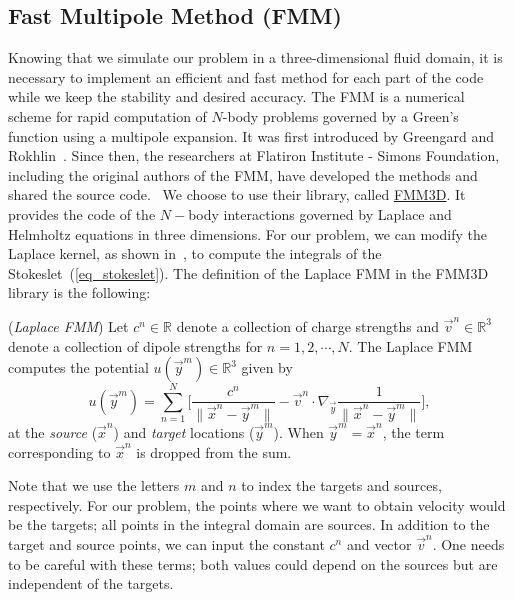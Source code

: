 \subsection{Fast Multipole Method (FMM)}
\label{subsec:FMM}
Knowing that we simulate our problem in a three-dimensional fluid domain, it is necessary to implement an efficient and fast method for each part of the code while we keep the stability and desired accuracy. 
The FMM is a numerical scheme for rapid computation of $N$-body problems governed by a Green's function using a multipole expansion. It was first introduced by Greengard and Rokhlin~\cite{greengard_fast_1987}. Since then, the researchers at Flatiron Institute - Simons Foundation,  including the original authors of the FMM, have developed the methods and shared the source code.~\cite{cheng_fast_1999,greengard_new_1997,greengard_new_2002} We choose to use their library, called \href{https://github.com/flatironinstitute/FMM3D}{{\color{blue}FMM3D}}. It provides the code of the $N-$body interactions governed by Laplace and Helmholtz equations in three dimensions.
For our problem, we can modify the Laplace kernel, as shown in~\cite{tornberg_fast_2008}, to compute the integrals of the Stokeslet~(\ref{eq_stokeslet}).
The definition of the Laplace FMM in the FMM3D library is the following:
\begin{definition} (\textit{Laplace FMM})
	\label{eq_def_FMM}
	Let $c^n \in \mathbb{R}$ denote a collection of charge strengths and $\vec{v}^n \in \mathbb{R}^3$ denote a collection of dipole strengths for $n = 1,2, \cdots, N$.
	The Laplace FMM computes the potential $u(\vec{y}^m) \in \mathbb{R}^3$ given by
\begin{equation}
	u(\vec{y}^m) = \sum_{n = 1}^{N} 
		\Biggl[
		\frac{c^n}{\|\vec{x}^n - \vec{y}^m \|}
			- \vec{v}^n \cdot \nabla_{\vec{y}} 
			 \frac{1}{\|\vec{x}^n - \vec{y}^m \|}
		\Biggr],
\label{eq_fmm3d_package}
\end{equation}
	at the \textit{source} ($\vec{x}^n$) and \textit{target} locations ($\vec{y}^m$). 
	When $\vec{y}^m = \vec{x}^n$, the term corresponding to $\vec{x}^n$
	is dropped from the sum.
\end{definition}
\noindent
Note that we use the letters $m$ and $n$ to index the targets and sources, respectively. For our problem, the points where we want to obtain velocity would be the targets; all points in the integral domain are sources.
In addition to the target and source points, we can input the constant $c^n$ and vector $\vec{v}^{n}$. One needs to be careful with these terms; both values could depend on the sources but are independent of the targets. 
